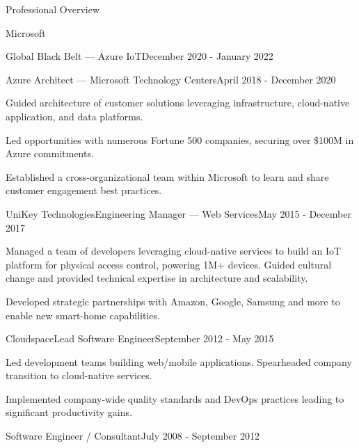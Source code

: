 \documentclass{resume} %
\begin{document}
\begin{rSection}{Professional Overview}
\begin{rCompany}{Microsoft}{}{}
\begin{rSubSubsection}{Global Black Belt --- Azure IoT}{December 2020 - January 2022}
    \end{rSubSubsection}

    \begin{rSubSubsection}{Azure Architect --- Microsoft Technology Centers}{April 2018 - December 2020}
        
      \item Guided architecture of customer solutions leveraging infrastructure, cloud-native application, and data platforms.
      \item Led opportunities with numerous Fortune 500 companies, securing over \$100M in Azure commitments.
      \item Established a cross-organizational team within Microsoft to learn and share customer engagement best practices.
      
    \end{rSubSubsection}

  \end{rCompany}
  
  
  \begin{rNewRole}{UniKey Technologies}{Engineering Manager --- Web Services}{May 2015 - December 2017}
    
    \item Managed a team of developers leveraging cloud-native services to build an IoT platform for physical access control, powering 1M+ devices.  Guided cultural change and provided technical expertise in architecture and scalability.
    \item Developed strategic partnerships with Amazon, Google, Samsung and more to enable new smart-home capabilities.
    
  \end{rNewRole}
  
  
  \begin{rNewRole}{Cloudspace}{Lead Software Engineer}{September 2012 - May 2015}
    
    \item Led development teams building web/mobile applications. Spearheaded company transition to cloud-native services.
    \item Implemented company-wide quality standards and DevOps practices leading to significant productivity gains.
    
  \end{rNewRole}
  
  
  \begin{rCompany}{Software Engineer / Consultant}{July 2008 - September 2012}{}

  \end{rCompany}
  
  
  
\end{rSection}
\end{document}
